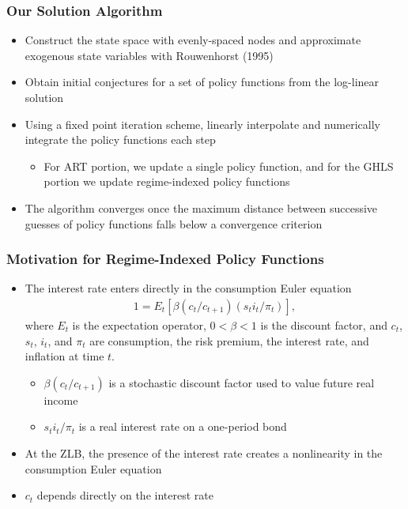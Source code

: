 \documentclass[11pt]{beamer}
\begin{document}
\begin{frame}\frametitle{Our Solution Algorithm} %
\begin{itemize}\setlength{\itemsep}{8pt}
\item   <1-|handout:1>Construct the state space with evenly-spaced nodes and approximate exogenous state variables with Rouwenhorst (1995)
\item  <2-|handout:1>Obtain initial conjectures for a set of policy functions from the log-linear solution
\item  <3-|handout:1>Using a fixed point iteration scheme, linearly interpolate and numerically integrate the policy functions each step
\begin{itemize}
\item For ART portion, we update a single policy function, and for the GHLS portion we update regime-indexed policy functions
\end{itemize}
\item <5-|handout:1> The algorithm converges once the maximum distance between successive guesses of policy functions falls below a convergence criterion

\end{itemize}
\end{frame}
\begin{frame}\frametitle{Motivation for Regime-Indexed Policy Functions}
\begin{itemize}\setlength{\itemsep}{6pt}
\item  <1-|handout:1>The interest rate enters directly in the consumption Euler equation
\begin{gather*}
1 =  E_t[\beta(c_t/c_{t+1})(s_ti_t/\pi_t)],
\end{gather*}
where $E_t$ is the expectation operator, $0 < \beta < 1$ is the discount factor, and $c_t$, $s_t$, $i_t$, and $\pi_t$ are consumption, the risk premium, the interest rate, and inflation at time $t$. 
\begin{itemize} \small
\item $\beta(c_t/c_{t+1})$ is a stochastic discount factor used to value future real income
\item $s_ti_t/\pi_t$ is a real interest rate on a one-period bond
\end{itemize}\normalfont
\item <2-|handout:1> At the ZLB, the presence of the interest rate creates a nonlinearity in the consumption Euler equation 
\item <3-|handout:1> $c_t$ depends directly on the interest rate
\end{itemize}
\end{frame}
\end{document}
